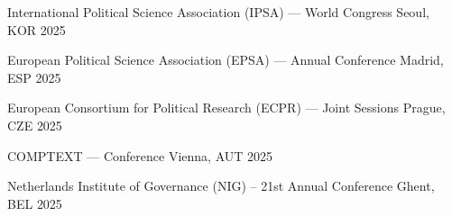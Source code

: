 






\vspace{1mm}

\begin{cvhonors}
\cvconf
{International Political Science Association (IPSA) --- World Congress} 
{Seoul, KOR}
{2025}
\end{cvhonors}

\begin{cvhonors}
\cvconf
{European Political Science Association (EPSA) --- Annual Conference} 
{Madrid, ESP}
{2025}
\end{cvhonors}

\begin{cvhonors}
\cvconf
{European Consortium for Political Research (ECPR) --- Joint Sessions} 
{Prague, CZE}
{2025}
\end{cvhonors}

\begin{cvhonors}
\cvconf
{COMPTEXT --- Conference} 
{Vienna, AUT}
{2025}
\end{cvhonors}

\begin{cvhonors}
\cvconf
{Netherlands Institute of Governance (NIG) -- 21st Annual Conference} 
{Ghent, BEL}
{2025}
\end{cvhonors}

